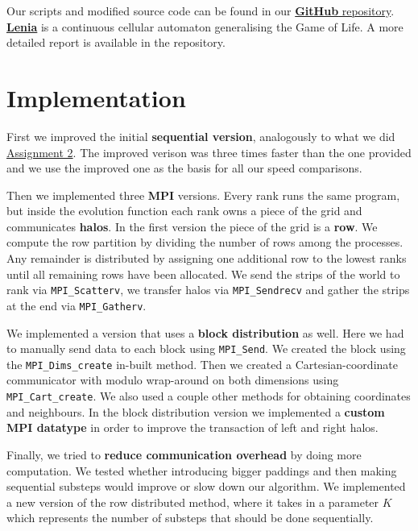 \documentclass[11pt]{article}
\begin{document}
\maketitle

Our scripts and modified source code can be found in our \href{https://github.com/Edelwy/HPC}{\textbf{GitHub} repository}. \href{https://chakazul.github.io/lenia.html}{\textbf{Lenia}} is a continuous cellular automaton generalising the Game of Life. A more detailed report is available in the repository.

\section{Implementation}

First we improved the initial \textbf{sequential version}, analogously to what we did \href{https://github.com/Edelwy/HPC/blob/main/Assignment2/src/src/lenia_opt.cu}{Assignment 2}. The improved verison was three times faster than the one provided and we use the improved one as the basis for all our speed comparisons. 

Then we implemented three \textbf{MPI} versions. Every rank runs the same program, but inside the evolution function each rank owns a piece of the grid and communicates \textbf{halos}. In the first version the piece of the grid is a \textbf{row}. We compute the row partition by dividing the number of rows among the processes. Any remainder is distributed by assigning one additional row to the lowest ranks until all remaining rows have been allocated. We send the strips of the world to rank via \texttt{MPI\_Scatterv}, we transfer halos via \texttt{MPI\_Sendrecv} and gather the strips at the end via \texttt{MPI\_Gatherv}.

We implemented a version that uses a \textbf{block distribution} as well. Here we had to manually send data to each block using \texttt{MPI\_Send}. We created the block using the \texttt{MPI\_Dims\_create} in-built method. Then we created a Cartesian-coordinate communicator with modulo wrap-around on both dimensions using \texttt{MPI\_Cart\_create}. We also used a couple other methods for obtaining coordinates and neighbours. In the block distribution version we implemented a \textbf{custom MPI datatype} in order to improve the transaction of left and right halos.

Finally, we tried to \textbf{reduce communication overhead} by doing more computation. We tested whether introducing bigger paddings and then making sequential substeps would improve or slow down our algorithm. We implemented a new version of the row distributed method, where it takes in a parameter $K$ which represents the number of substeps that should be done sequentially. 
\end{document}
